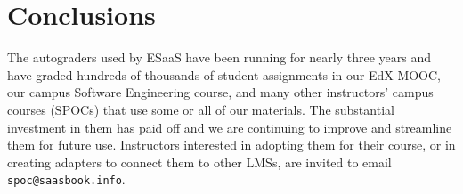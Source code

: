 \section{Conclusions}

The autograders used by ESaaS have been running for nearly three years
and have graded hundreds of thousands of student assignments in our EdX
MOOC, our campus Software Engineering course, and many other
instructors' campus courses (SPOCs) that use some or all of our materials.
The substantial investment in them has paid off and we are continuing to
improve and streamline them for future use.
Instructors interested in adopting them for their course, or in
creating adapters to connect them to other LMSs, are invited to
email \texttt{spoc@saasbook.info}.


